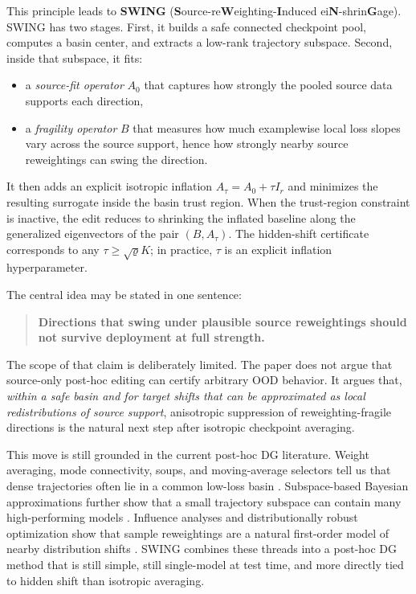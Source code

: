 \documentclass{article}
\newcommand{\swing}{\textup{\textsc{SWING}}}
\newcommand{\ood}{OOD}
\begin{document}
This principle leads to \textbf{\swing{}} (\textbf{S}ource-re\textbf{W}eighting-\textbf{I}nduced ei\textbf{N}-shrin\textbf{G}age). \swing{} has two stages. First, it builds a safe connected checkpoint pool, computes a basin center, and extracts a low-rank trajectory subspace. Second, inside that subspace, it fits:
\begin{itemize}[leftmargin=1.4em]
    \item a \emph{source-fit operator} \(A_0\) that captures how strongly the pooled source data supports each direction,
    \item a \emph{fragility operator} \(B\) that measures how much examplewise local loss slopes vary across the source support, hence how strongly nearby source reweightings can swing the direction.
\end{itemize}
It then adds an explicit isotropic inflation \(A_\tau = A_0 + \tau I_r\) and minimizes the resulting surrogate inside the basin trust region. When the trust-region constraint is inactive, the edit reduces to shrinking the inflated baseline along the generalized eigenvectors of the pair \((B, A_\tau)\). The hidden-shift certificate corresponds to any \(\tau \ge \sqrt{\varrho}K\); in practice, \(\tau\) is an explicit inflation hyperparameter.

The central idea may be stated in one sentence:
\begin{quote}
\textbf{Directions that swing under plausible source reweightings should not survive deployment at full strength.}
\end{quote}

The scope of that claim is deliberately limited. The paper does not argue that source-only post-hoc editing can certify arbitrary \ood{} behavior. It argues that, \emph{within a safe basin and for target shifts that can be approximated as local redistributions of source support}, anisotropic suppression of reweighting-fragile directions is the natural next step after isotropic checkpoint averaging.

This move is still grounded in the current post-hoc DG literature. Weight averaging, mode connectivity, soups, and moving-average selectors tell us that dense trajectories often lie in a common low-loss basin \citep{izmailov2018swa,garipov2018fge,frankle2020linear,wortsman2022soups,arpit2022eoa}. Subspace-based Bayesian approximations further show that a small trajectory subspace can contain many high-performing models \citep{izmailov2020subspace}. Influence analyses and distributionally robust optimization show that sample reweightings are a natural first-order model of nearby distribution shifts \citep{koh2017influence,duchi2020variance,duchi2021learning}. \swing{} combines these threads into a post-hoc DG method that is still simple, still single-model at test time, and more directly tied to hidden shift than isotropic averaging.
\end{document}
